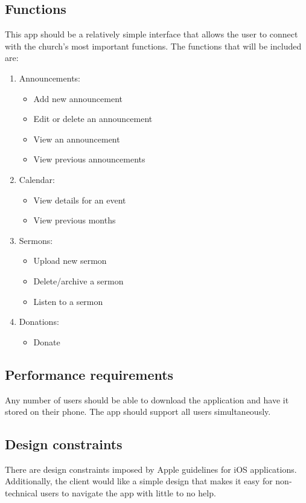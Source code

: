 \documentclass[letterpaper,10pt,draftclsnofoot,onecolumn,compsoc,titlepage]{IEEEtran}
\begin{document}
	\subsection{Functions}
	This app should be a relatively simple interface that allows the user to connect with the church's most important functions.
	The functions that will be included are:
	\begin{enumerate}
		\item{Announcements:}
			\begin{itemize}
				\item{Add new announcement}
				\item{Edit or delete an announcement}
				\item{View an announcement}
				\item{View previous announcements}
			\end{itemize}
		\item{Calendar:}
			\begin{itemize}
				\item{View details for an event}
				\item{View previous months}
			\end{itemize}
		\item{Sermons:}
			\begin{itemize}
				\item{Upload new sermon}
				\item{Delete/archive a sermon}
				\item{Listen to a sermon}
			\end{itemize}
		\item{Donations:}
			\begin{itemize}
				\item{Donate}
			\end{itemize}
	\end{enumerate}


	\subsection{Performance requirements}
	Any number of users should be able to download the application and have it stored on their phone.
	The app should support all users simultaneously.

	\subsection{Design constraints}
	There are design constraints imposed by Apple guidelines for iOS applications.
	Additionally, the client would like a simple design that makes it easy for non-technical users to navigate the app with little to no help.
\end{document}
